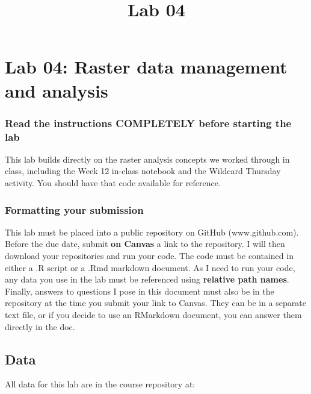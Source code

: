 \documentclass[
]{article}
\title{Lab 04}
\author{}
\date{\vspace{-2.5em}}
\begin{document}
\maketitle

\hypertarget{lab-04-raster-data-management-and-analysis}{%
\section{Lab 04: Raster data management and
analysis}\label{lab-04-raster-data-management-and-analysis}}

\hypertarget{read-the-instructions-completely-before-starting-the-lab}{%
\subsubsection{Read the instructions COMPLETELY before starting the
lab}\label{read-the-instructions-completely-before-starting-the-lab}}

This lab builds directly on the raster analysis concepts we worked
through in class, including the Week 12 in-class notebook and the
Wildcard Thursday activity. You should have that code available for
reference.

\hypertarget{formatting-your-submission}{%
\subsubsection{Formatting your
submission}\label{formatting-your-submission}}

This lab must be placed into a public repository on GitHub
(www.github.com). Before the due date, submit \textbf{on Canvas} a link
to the repository. I will then download your repositories and run your
code. The code must be contained in either a .R script or a .Rmd
markdown document. As I need to run your code, any data you use in the
lab must be referenced using \textbf{relative path names}. Finally,
answers to questions I pose in this document must also be in the
repository at the time you submit your link to Canvas. They can be in a
separate text file, or if you decide to use an RMarkdown document, you
can answer them directly in the doc.

\hypertarget{data}{%
\subsection{Data}\label{data}}

All data for this lab are in the course repository at:
\end{document}
